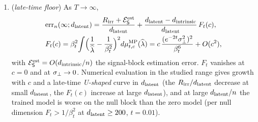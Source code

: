 \begin{proposition}
\begin{enumerate}
\item[(d)] (\emph{late-time floor}) As $T\to\infty$,
\begin{equation}\label{eq:lin-floor}
\begin{aligned}
&\mathrm{err}_n(\infty;d_{\mathrm{latent}})=\frac{R_{\mathrm{irr}}+\mathcal E^{\rm est}_{\mathsf S}}{d_{\mathrm{latent}}}+\frac{d_{\mathrm{latent}}-d_{\mathrm{intrinsic}}}{d_{\mathrm{latent}}}\,F_t(c),\\ & F_t(c)=\beta_t^2\!\int\!\Big(\frac1{\widehat\lambda}-\frac1{\beta_t^2}\Big)^2d\mu^{\rm MP}_{t,c}(\widehat\lambda)=c\,\frac{(e^{-2t}\sigma_{\perp}^2)^2}{\beta_t^6}+O(c^2),
\end{aligned}
\end{equation}
with $\mathcal E^{\rm est}_{\mathsf S}=O(d_{\mathrm{intrinsic}}/n)$ the signal-block estimation error. $F_t$ vanishes at $c=0$ and at $\sigma_{\perp}\to0$. Numerical evaluation in the studied range gives growth with $c$ and a late-time \emph{U-shaped} curve in $d_{\mathrm{latent}}$ (the $R_{\mathrm{irr}}/d_{\mathrm{latent}}$ decrease at small $d_{\mathrm{latent}}$, the $F_t(c)$ increase at large $d_{\mathrm{latent}}$), and at large $d_{\mathrm{latent}}/n$ the trained model is worse on the null block than the zero model (per null dimension $F_t>1/\beta_t^2$ at $d_{\mathrm{latent}}\ge200$, $t=0.01$).
\end{enumerate}
\end{proposition}
